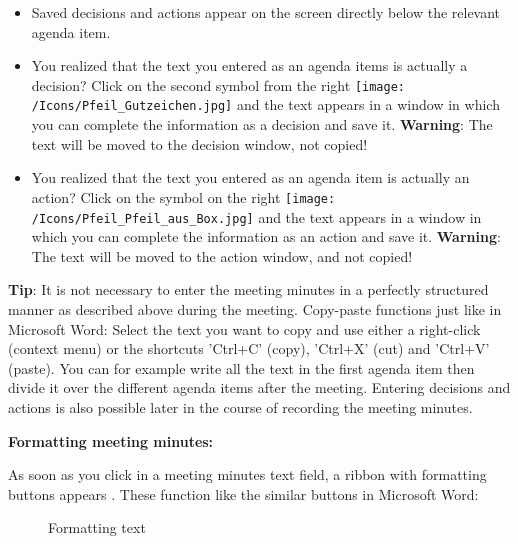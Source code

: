 \begin{itemize}
\item
Saved decisions and actions appear on the screen directly below the relevant agenda item.
\item
You realized that the text you entered as an agenda items is actually a decision? Click on the second symbol from the right \texttt{[image: /Icons/Pfeil\_Gutzeichen.jpg]}  and the text appears in a window in which you can complete the information as a decision and save it. \textbf{Warning}: The text will be moved to the decision window, not copied!
\item
You realized that the text you entered as an agenda item is actually an action? Click on the symbol on the right \texttt{[image: /Icons/Pfeil\_Pfeil\_aus\_Box.jpg]}  and the text appears in a window in which you can complete the information as an action and save it. \textbf{Warning}: The text will be moved to the action window, and not copied!
\end{itemize}


\textbf{Tip}: It is not necessary to enter the meeting minutes in a perfectly structured manner as described above during the meeting. Copy-paste functions just like in Microsoft Word: Select the text you want to copy and use either a right-click (context menu) or the shortcuts 'Ctrl+C' (copy), 'Ctrl+X' (cut) and 'Ctrl+V' (paste). You can for example write all the text in the first agenda item then divide it over the different agenda items after the meeting. Entering decisions and actions is also possible later in the course of recording the meeting minutes.

\vspace{\baselineskip}

\textbf{Formatting meeting minutes:}


As soon as you click in a meeting minutes text field, a ribbon with formatting buttons appears . These function like the similar buttons in Microsoft Word:

\begin{figure}[H]
\caption{Formatting text}
\end{figure}

